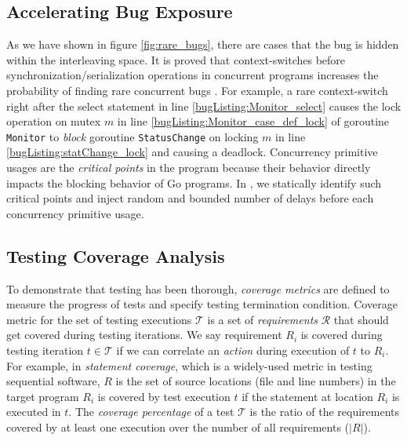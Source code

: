 \subsection{Accelerating Bug Exposure}
As we have shown in figure \ref{fig:rare_bugs}, there are cases that the bug is hidden within  the interleaving space.
%
It is proved that context-switches before synchronization/serialization operations in concurrent programs increases the probability of finding rare concurrent bugs \cite{burckhardt-depthBug-asplos10}.
%
For example, a rare context-switch right after the select statement in line \ref{bugListing:Monitor_select} causes the lock operation on mutex $m$ in line \ref{bugListing:Monitor_case_def_lock} of goroutine \texttt{Monitor} to \textit{block} goroutine \texttt{StatusChange} on locking $m$ in line \ref{bugListing:statChange_lock} and causing a deadlock.
%
Concurrency primitive usages are the \textit{critical points} in the program because their behavior directly impacts the blocking behavior of Go programs.
%
In \goat, we statically identify such critical points and inject random and bounded number of delays before
each concurrency primitive usage.
%


\subsection{Testing Coverage Analysis}
\label{sec:coverage}
To demonstrate that testing has been thorough, \textit{coverage metrics} are defined to measure the progress of tests and specify testing termination condition.
%
Coverage metric for the set of testing executions $\mathcal{T}$ is a set of \textit{requirements} $\mathcal{R}$ that should get covered during testing iterations.
%
We say requirement $R_i$ is covered during testing iteration $t \in \mathcal{T}$ if we can correlate an \textit{action} during execution of $t$ to $R_i$.
%
For example, in \textit{statement coverage}, which is a widely-used metric in testing sequential software, $R$ is the set of source locations (file and line numbers) in the target program
%
$R_i$ is covered by test execution $t$ if the statement at location $R_i$ is executed in $t$.
%
The \textit{coverage percentage} of a test $\mathcal{T}$ is the ratio of the requirements covered by at least one execution over the number of all requirements ($|R|$).

